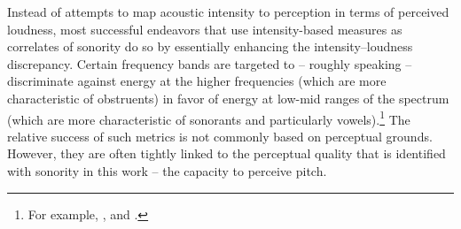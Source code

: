 Instead of attempts to map acoustic intensity to perception in terms of perceived loudness, most successful endeavors that use intensity-based measures as correlates of sonority do so by essentially enhancing the intensity--loudness discrepancy. Certain frequency bands are targeted to -- roughly speaking -- discriminate against energy at the higher frequencies (which are more characteristic of obstruents) in favor of energy at low-mid ranges of the spectrum (which are more characteristic of sonorants and particularly vowels).\footnote{For example, \citet{Pfitzinger1996syllablesk, port1996dynamic, fant2000source, galves2002sonoritysk, wang2007robust, tilsen2013speech, patha2016syllablesk, nakajima2017english}, and \citet{rasanen2018pre}.}
The relative success of such metrics is not commonly based on perceptual grounds. However, they are often tightly linked to the perceptual quality that is identified with sonority in this work -- the capacity to perceive pitch.
